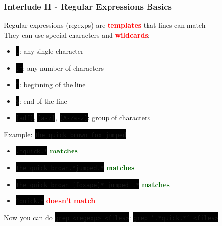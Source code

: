 \documentclass[unknownkeysallowed, 10pt, a4 paper, handout]{beamer}
\newcommand{\green}[1]{\textbf{\textcolor{darkgreen}{#1}}}
\newcommand{\red}[1]{\textbf{\textcolor{red}{#1}}}
\newcommand{\focus}[1]{\textbf{\textcolor{red}{#1}}}
\newcommand{\code}[1]{\colorbox{black}{\color{green}\texttt{#1}}}
\begin{document}
\begin{frame}
  \begin{center}
    \frametitle{Interlude II - Regular Expressions Basics}

    Regular expressions (regexps) are \focus{templates} that lines can match\\
    They can use special characters and \focus{wildcards}:

    \begin{itemize}
      \item \code{.}: any single character
      \item \code{.*}: any number of characters
      \item \code{\^}: beginning of the line
      \item \code{\$}: end of the line
      \item \code{[adf]}, \code{[a-z]}, \code{[A-Za-z]}: group of characters
    \end{itemize}

    Example: \code{The quick brown fox jumped}
    \vspace{-2mm}

    \begin{itemize}
      \item \code{.*quick.*} \green{matches}
      \item \code{The quick brown.*jumped.*} \green{matches}
      \item \code{The quick brown [foxape]* jumped .*} \green{matches}
      \item \code{\^{}quick.*} \red{doesn't match}
    \end{itemize}

    Now you can do \code{grep <regexp> <files>}:
    \code{grep '.*quick.*' <files>}
  \end{center}
\end{frame}
\end{document}
